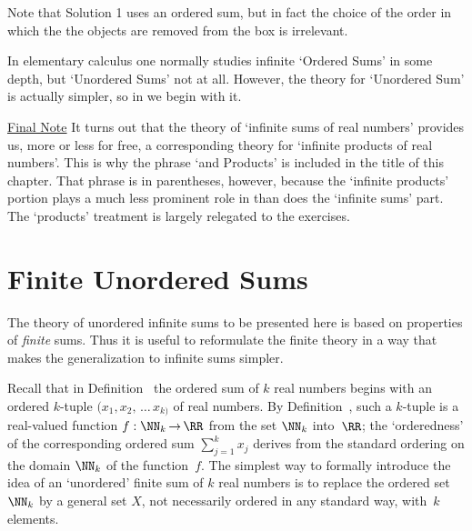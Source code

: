 \VA

        Note that Solution 1 uses an ordered sum, but in fact the choice of the order in which the the objects are removed from the box is irrelevant.

\VV

        In elementary calculus one normally studies infinite `Ordered Sums' in some depth, but `Unordered Sums' not at all.
    However, the theory for `Unordered Sum' is actually simpler, so in {\TheseNotes} we begin with it.

\V
\V

        \underline{Final Note} It turns out that the theory of `infinite sums of real numbers' provides us, more or less for free,
    a corresponding theory for `infinite products of real numbers'.
    This is why the phrase `and Products' is included in the title of this chapter.
    That phrase is in parentheses, however, because the `infinite products' portion plays a much less prominent role in {\TheseNotes} than does the `infinite sums' part.
    The `products' treatment is largely relegated to the exercises.

\VV


            \section{\small{\bf Finite Unordered Sums}}
            \label{SectG23}

\V


        The theory of unordered infinite sums to be presented here is based on properties of {\em finite} sums.
            Thus it is useful to reformulate the finite theory in a way that makes the generalization to infinite sums simpler.

        Recall that in Definition~ the ordered sum of $k$ real numbers begins with an ordered $k$-tuple $(x_{1}, x_{2}, \,{\ldots\, x_{k)}}$ of real numbers.
    By Definition~, such a $k$-tuple is a real-valued function $f:{\NN}_{k}\,{\rightarrow}\,{\RR}$ from the set ${\NN}_{k}$ into~${\RR}$;
    the `orderedness' of the corresponding ordered sum $\sum_{j=1}^{k} x_{j}$ derives from the standard ordering on the domain ${\NN}_{k}$ of the function~$f$.
    The simplest way to formally introduce the idea of an `unordered' finite sum of $k$ real numbers is to replace the ordered set ${\NN}_{k}$ by a general set $X$, not necessarily ordered in any standard way, with~$k$ elements.
    
